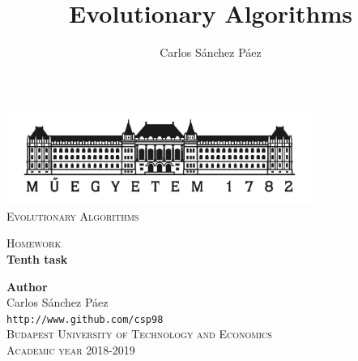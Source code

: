 \documentclass[12pt,english]{article}
\title{Evolutionary Algorithms}
\author{Carlos Sánchez Páez}
\begin{document}
\begin{titlepage}

\newlength{\centeroffset}
\setlength{\centeroffset}{-0.5\oddsidemargin}
\addtolength{\centeroffset}{0.5\evensidemargin}
\thispagestyle{empty}

\noindent\hspace*{\centeroffset}
\begin{minipage}{\textwidth}

\centering
\includegraphics[width=0.75\textwidth]{bme_logo.jpg}\\[1.4cm]

\textsc{ \Large Evolutionary Algorithms\\[4cm]}

\textsc{\Huge Homework}\\[0.75cm]

{\Large\bfseries Tenth task\\}
\end{minipage}

\vspace{8cm}
\noindent\hspace*{\centeroffset}
\begin{minipage}{\textwidth}
\centering

\textbf{Author}\\ {Carlos Sánchez Páez}\\
\texttt{http://www.github.com/csp98}\\[0.5cm]
\textsc{Budapest University of Technology and Economics}\\
\vspace{1cm}
\textsc{Academic year 2018-2019}
\end{minipage}
\end{titlepage}
\thispagestyle{empty}

\newpage
\end{document}
